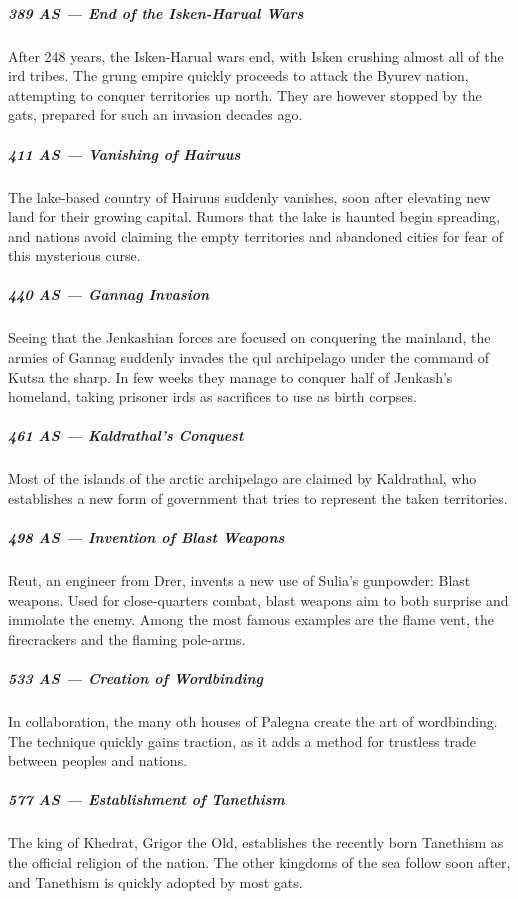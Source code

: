 \begin{linenumbers}
\subparagraph{389 AS --- End of the Isken-Harual Wars} After 248 years, the Isken-Harual wars end, with Isken crushing almost all of the ird tribes.
The grung empire quickly proceeds to attack the Byurev nation, attempting to conquer territories up north.
They are however stopped by the gats, prepared for such an invasion decades ago.

\subparagraph{411 AS --- Vanishing of Hairuus} The lake-based country of Hairuus suddenly vanishes, soon after elevating new land for their growing capital.
Rumors that the lake is haunted begin spreading, and nations avoid claiming the empty territories and abandoned cities for fear of this mysterious curse.

\subparagraph{440 AS --- Gannag Invasion} Seeing that the Jenkashian forces are focused on conquering the mainland, the armies of Gannag suddenly invades the qul archipelago under the command of Kutsa the sharp.
In few weeks they manage to conquer half of Jenkash's homeland, taking prisoner irds as sacrifices to use as birth corpses.

\subparagraph{461 AS --- Kaldrathal's Conquest} Most of the islands of the arctic archipelago are claimed by Kaldrathal, who establishes a new form of government that tries to represent the taken territories.

\subparagraph{498 AS --- Invention of Blast Weapons} Reut, an engineer from Drer, invents a new use of Sulia's gunpowder: Blast weapons.
Used for close-quarters combat, blast weapons aim to both surprise and immolate the enemy.
Among the most famous examples are the flame vent, the firecrackers and the flaming pole-arms.

\subparagraph{533 AS --- Creation of Wordbinding} In collaboration, the many oth houses of Palegna create the art of wordbinding.
The technique quickly gains traction, as it adds a method for trustless trade between peoples and nations.


\subparagraph{577 AS --- Establishment of Tanethism} The king of Khedrat, Grigor the Old, establishes the recently born Tanethism as the official religion of the nation.
The other kingdoms of the sea follow soon after, and Tanethism is quickly adopted by most gats.


\end{linenumbers}
